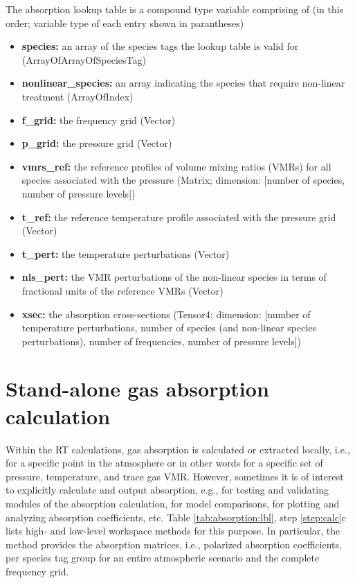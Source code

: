 The absorption lookup table is a compound type variable comprising of (in this
order; variable type of each entry shown in parantheses)
\begin{itemize}
\item \textbf{species:} an array of the species tags the lookup table is valid for
(ArrayOfArrayOfSpeciesTag)
\item \textbf{nonlinear\_species:} an array indicating the species that require non-linear treatment
(ArrayOfIndex)
\item \textbf{f\_grid:} the frequency grid (Vector)
\item \textbf{p\_grid:} the pressure grid (Vector)
\item \textbf{vmrs\_ref:} the reference profiles of volume mixing ratios (VMRs) for all species
associated with the pressure (Matrix; dimension: [number of species, number of
pressure levels])
\item \textbf{t\_ref:} the reference temperature profile associated with the
pressure grid (Vector)
\item \textbf{t\_pert:} the temperature perturbations (Vector)
\item \textbf{nls\_pert:} the VMR perturbations of the non-linear species in
terms of fractional units of the reference VMRs (Vector)
\item \textbf{xsec:} the absorption cross-sections (Tensor4; dimension: [number
of temperature perturbations, number of species (and non-linear species
perturbations), number of frequencies, number of pressure levels])
\end{itemize}

\section{Stand-alone gas absorption calculation}
\label{sec:absorption:abs-only}

Within the RT calculations, gas absorption is calculated or extracted locally,
i.e., for a specific point in the atmosphere or in other words for a specific
set of pressure, temperature, and trace gas VMR. However, sometimes it is of
interest to explicitly calculate and output absorption, e.g., for testing and
validating modules of the absorption calculation,  for model comparisons, for
plotting and analyzing absorption coefficients, etc.
Table \ref{tab:absorption:lbl}, step \ref{step:calc}c lists high- and low-level
workspace methods for this purpose.
In particular, the method  provides the absorption
matrices, i.e., polarized absorption coefficients, per species tag group for
an entire atmospheric scenario and the complete frequency grid.



